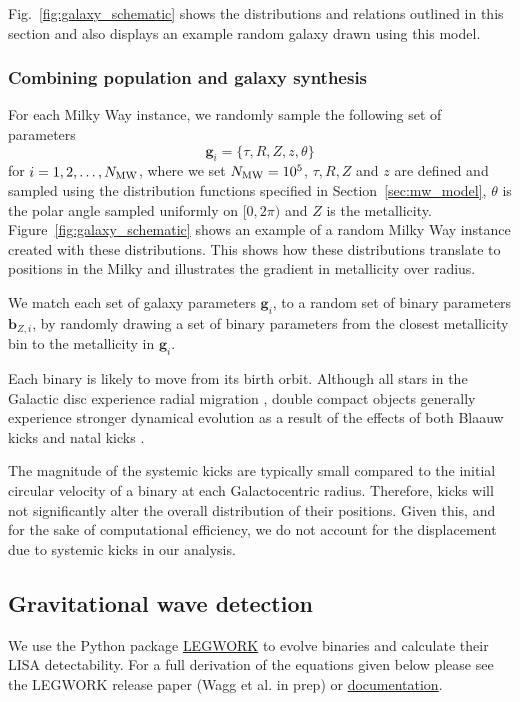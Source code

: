 Fig.~\ref{fig:galaxy_schematic} shows the distributions and relations outlined in this section and also displays an example random galaxy drawn using this model.

\subsubsection{Combining population and galaxy synthesis}\label{sec:combining_pop_gal}

For each Milky Way instance, we randomly sample the following set of parameters
\begin{equation}
    \mathbf{g}_{{i}} = \{\tau, R, Z, z, \theta\}
\end{equation}
for $i = 1, 2, \dots, N_{\rm MW}$, where we set $N_{\rm MW} = 10^{5}$, $\tau, R, Z$ and $z$ are defined and sampled using the distribution functions specified in Section~\ref{sec:mw_model}, $\theta$ is the polar angle sampled uniformly on $[0, 2\pi)$ and $Z$ is the metallicity. Figure~\ref{fig:galaxy_schematic} shows an example of a random Milky Way instance created with these distributions. This shows how these distributions translate to positions in the Milky and illustrates the gradient in metallicity over radius.

We match each set of galaxy parameters $\mathbf{g}_{{i}}$, to a random set of binary parameters $\mathbf{b}_{{Z, i}}$, by randomly drawing a set of binary parameters from the closest metallicity bin to the metallicity in $\mathbf{g}_{{i}}$.

Each binary is likely to move from its birth orbit. Although all stars in the Galactic disc experience radial migration \citep{Sellwood+2002, Frankel+2018}, double compact objects generally experience stronger dynamical evolution as a result of the effects of both Blaauw kicks \citep{Blaauw+1961} and natal kicks \citep{Hobbs+2005}.

The magnitude of the systemic kicks are typically small compared to the initial circular velocity of a binary at each Galactocentric radius. Therefore, kicks will not significantly alter the overall distribution of their positions. Given this, and for the sake of computational efficiency, we do not account for the displacement due to systemic kicks in our analysis.

\subsection{Gravitational wave detection}\label{sec:gw_detection}
We use the Python package \href{https://legwork.readthedocs.io/en/latest/}{LEGWORK} to evolve binaries and calculate their LISA detectability. For a full derivation of the equations given below please see the LEGWORK release paper (Wagg et al. in prep) or \href{https://legwork.readthedocs.io/en/latest/notebooks/Derivations.html}{documentation}.

